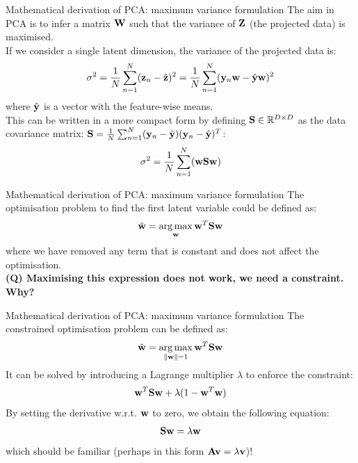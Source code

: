 \documentclass[aspectratio=169,notes]{beamer}
\begin{document}
	\begin{frame}{Mathematical derivation of PCA: maximum variance formulation}
	The aim in PCA is to infer a matrix ${\bf W}$ such that the variance of ${\bf Z}$ (the projected data) is maximised.\\
	If we consider a single latent dimension, the variance of the projected data is:
	\begin{equation*}
		\sigma^2 = \frac{1}{N}\sum_{n=1}^{N} ({\bf z}_n - \hat{{\bf z}})^{2} = \frac{1}{N}\sum_{n=1}^{N} ({\bf y}_n {\bf w} - \hat{{\bf y}}{\bf w})^{2}
	\end{equation*}
	where $\hat{{\bf y}}$ is a vector with the feature-wise means.\\
	\leavevmode\newline
	This can be written in a more compact form by defining ${\bf S} \in \mathbb{R}^{D \times D}$ as the data covariance matrix: ${\bf S} = \frac{1}{N}\sum_{n=1}^{N} ({\bf y}_n - \hat{{\bf y}})({\bf y}_n - \hat{{\bf y}})^T$: %
	\[
		\sigma^2 = \frac{1}{N}\sum_{n=1}^{N} ({\bf w} {\bf S} {\bf w})
	\]
	\end{frame}

	\begin{frame}{Mathematical derivation of PCA: maximum variance formulation}
	The optimisation problem to find the first latent variable could be defined as:
	\[
		\hat{{\bf w}} = \operatorname*{arg\,max}_{{\bf w}} {\bf w}^T {\bf S} {\bf w}
	\]
	where we have removed any term that is constant and does not affect the optimisation.\\
	\leavevmode\newline
	\textbf{(Q) Maximising this expression does not work, we need a constraint. Why?}
	\end{frame}

	\begin{frame}{Mathematical derivation of PCA: maximum variance formulation}
	The constrained optimisation problem can be defined as:
	\[
		\hat{{\bf w}} = \operatorname*{arg\,max}_{\|{\bf w}\|=1} {\bf w}^T {\bf S} {\bf w}
	\]
	It can be solved by introducing a Lagrange multiplier $\lambda$ to enforce the constraint:
	\[
		{\bf w}^T {\bf S} {\bf w} + \lambda (1-{\bf w}^T{\bf w})
	\]
	By setting the derivative w.r.t. ${\bf w}$ to zero, we obtain the following equation:
	\[
		{\bf S} {\bf w} = \lambda {\bf w}
	\]
	which should be familiar (perhaps in this form ${\bf A} {\bf v} = \lambda {\bf v}$)!
	\end{frame}
\end{document}
